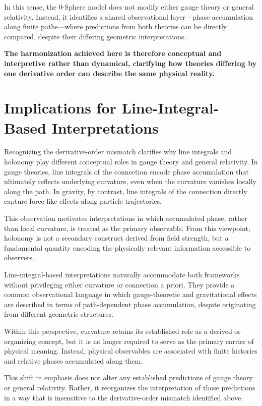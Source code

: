\documentclass[12pt,letterpaper]{article} %
\begin{document}
In this sense, the 0-Sphere model does not modify either gauge theory or general relativity. Instead, it identifies a shared observational layer—phase accumulation along finite paths—where predictions from both theories can be directly compared, despite their differing geometric interpretations.

\textbf{The harmonization achieved here is therefore conceptual and interpretive rather than dynamical, clarifying how theories differing by one derivative order can describe the same physical reality.}



\section{Implications for Line-Integral-Based Interpretations}

\justifying
Recognizing the derivative-order mismatch clarifies why line integrals and holonomy play different conceptual roles in gauge theory and general relativity. In gauge theories, line integrals of the connection encode phase accumulation that ultimately reflects underlying curvature, even when the curvature vanishes locally along the path. In gravity, by contrast, line integrals of the connection directly capture force-like effects along particle trajectories.

This observation motivates interpretations in which accumulated phase, rather than local curvature, is treated as the primary observable. From this viewpoint, holonomy is not a secondary construct derived from field strength, but a fundamental quantity encoding the physically relevant information accessible to observers.

Line-integral-based interpretations naturally accommodate both frameworks without privileging either curvature or connection a priori. They provide a common observational language in which gauge-theoretic and gravitational effects are described in terms of path-dependent phase accumulation, despite originating from different geometric structures.

Within this perspective, curvature retains its established role as a derived or organizing concept, but it is no longer required to serve as the primary carrier of physical meaning. Instead, physical observables are associated with finite histories and relative phases accumulated along them.

This shift in emphasis does not alter any established predictions of gauge theory or general relativity.  
Rather, it reorganizes the interpretation of those predictions in a way that is insensitive to the derivative-order mismatch identified above.
\end{document}
